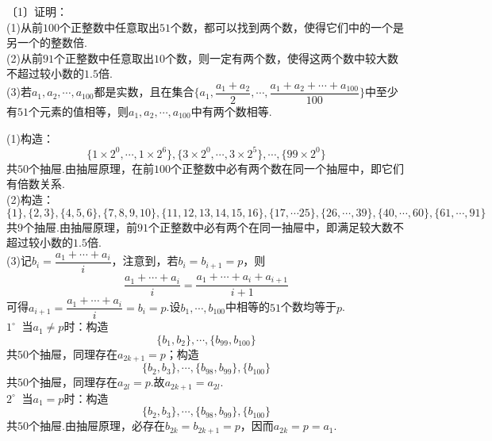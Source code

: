 \documentclass[lang=cn, zihao=4.5]{elegantbook}
\newcommand{\nd}[1]{〔#1〕}
\newcommand{\buzhou}[1]{$#1^{\circ} \ $}
\begin{document}
\begin{example} %
	\nd{1}证明： \\
	(1)从前$100$个正整数中任意取出$51$个数，都可以找到两个数，使得它们中的一个是另一个的整数倍. \\
	(2)从前$91$个正整数中任意取出$10$个数，则一定有两个数，使得这两个数中较大数不超过较小数的$1.5$倍. \\
	(3)若$a_1,a_2,\cdots ,a_{100}$都是实数，且在集合$\{ a_1, \dfrac{a_1+a_2}{2}, \cdots ,\dfrac{a_1+a_2+\cdots +a_{100}}{100} \}$中至少有$51$个元素的值相等，则$a_1,a_2, \cdots ,a_{100}$中有两个数相等.
\end{example}
\begin{solution}
	(1)构造：$$\{ 1 \times 2^0, \cdots , 1 \times 2^6 \},\{ 3 \times 2^0, \cdots , 3 \times 2^5 \}, \cdots ,\{99 \times 2^0 \}$$共$50$个抽屉.由抽屉原理，在前$100$个正整数中必有两个数在同一个抽屉中，即它们有倍数关系. \\
	(2)构造：$$\{ 1 \},\{ 2,3 \},\{ 4,5,6 \},\{ 7,8,9,10 \},\{ 11,12,13,14,15,16 \},\{ 17,\cdots 25 \},\{ 26,\cdots ,39 \},\{ 40, \cdots ,60 \},\{ 61, \cdots ,91 \}$$共$9$个抽屉.由抽屉原理，前$91$个正整数中必有两个在同一抽屉中，即满足较大数不超过较小数的$1.5$倍. \\
	(3)记$b_i=\dfrac{a_1+ \cdots + a_i}{i}$，注意到，若$b_i=b_{i+1}=p$，则$$\frac{a_1+ \cdots + a_i}{i} = \frac{a_1+ \cdots + a_i + a_{i+1}}{i+1}$$可得$a_{i+1} = \dfrac{a_1 + \cdots + a_i}{i} = b_i = p$.设$b_1, \cdots ,b_{100}$中相等的$51$个数均等于$p$. \\
	\buzhou{1} 当$a_1 \neq p$时：构造$$\{ b_1,b_2 \}, \cdots ,\{ b_{99},b_{100} \}$$共$50$个抽屉，同理存在$a_{2k+1}=p$；构造$$\{ b_2,b_3 \}, \cdots ,\{ b_{98},b_{99} \},\{ b_{100} \}$$共$50$个抽屉，同理存在$a_{2l}=p$.故$a_{2k+1}=a_{2l}$. \\
	\buzhou{2} 当$a_1=p$时：构造$$\{ b_2,b_3 \}, \cdots ,\{ b_{98},b_{99} \},\{ b_{100} \}$$共$50$个抽屉.由抽屉原理，必存在$b_{2k}=b_{2k+1}=p$，因而$a_{2k}=p=a_1$.
\end{solution}
\end{document}
